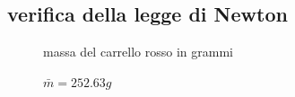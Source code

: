 \documentclass[a4paper]{article}
\theoremstyle{definition}
\begin{document}
\subsection*{verifica della legge di Newton}


\begin{figure}[!htbp]
	\captionsetup{labelformat=empty}
	\caption{massa del carrello rosso in grammi}
	\caption{\(\bar{m} = 252.63 g\)}
\end{figure}
\end{document}
